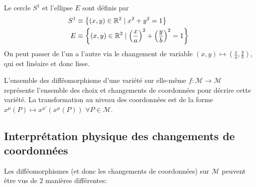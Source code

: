 \begin{exmp}
    Le cercle $S^1$ et l'ellipse $E$ sont définis par
    \begin{align}
        S^1 &\equiv \left\{ (x,y) \in \mathbb{R}^2 \mid x^2+y^2 = 1\right\} \\
        E &\equiv \left\{ (x,y) \in \mathbb{R}^2 \mid \left( \frac{x}{a} \right)^2 + \left( \frac{y}{b} \right)^2 = 1\right\}
    \end{align}
    On peut passer de l'un a l'autre via le changement de variable $(x, y) \mapsto (\frac{x}{a}, \frac{y}{b})$, qui est linéaire et donc lisse. 
\end{exmp}

L'ensemble des difféomorphisme d'une variété sur elle-même $f: \mathcal{M} \to \mathcal{M}$ représente l'ensemble des choix et changements de coordonnées pour décrire cette variété. La transformation au niveau des coordonnées est de la forme $x^{\mu}(P) \mapsto x^{\mu'}(x^\mu(P))$ $\forall P \in \mathcal{M}$. 

\subsection{Interprétation physique des changements de coordonnées}

Les difféomorphismes (et donc les changements de coordonnées) sur $\mathcal{M}$ peuvent être vus de 2 manières différentes:

